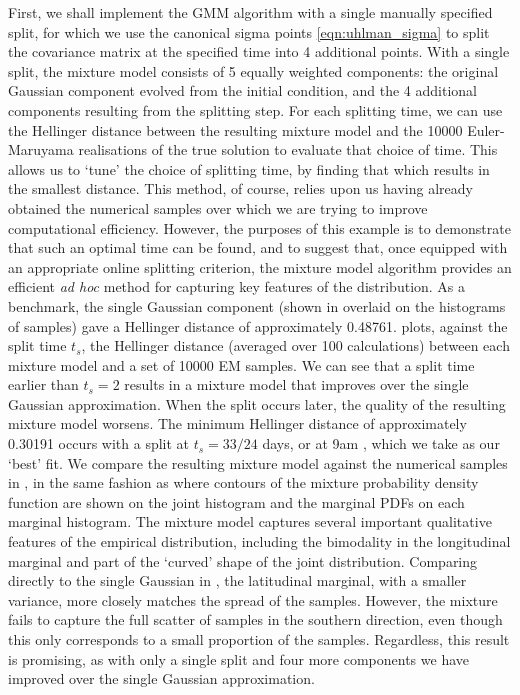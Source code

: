 First, we shall implement the GMM algorithm with a single manually specified split, for which we use the canonical sigma points \cref{eqn:uhlman_sigma} to split the covariance matrix at the specified time into 4 additional points.
With a single split, the mixture model consists of 5 equally weighted components: the original Gaussian component evolved from the initial condition, and the 4 additional components resulting from the splitting step.
For each splitting time, we can use the Hellinger distance between the resulting mixture model and the 10000 Euler-Maruyama realisations of the true solution to evaluate that choice of time.
This allows us to `tune' the choice of splitting time, by finding that which results in the smallest distance.
This method, of course, relies upon us having already obtained the numerical samples over which we are trying to improve computational efficiency.
However, the purposes of this example is to demonstrate that such an optimal time can be found, and to suggest that, once equipped with an appropriate online splitting criterion, the mixture model algorithm provides an efficient \emph{ad hoc} method for capturing key features of the distribution.
As a benchmark, the single Gaussian component (shown in  overlaid on the histograms of samples) gave a Hellinger distance of approximately 0.48761.
 plots, against the split time \(t_s\), the Hellinger distance (averaged over 100 calculations) between each mixture model and a set of 10000 EM samples.
We can see that a split time earlier than \(t_s = 2\) results in a mixture model that improves over the single Gaussian approximation.
When the split occurs later, the quality of the resulting mixture model worsens.
The minimum Hellinger distance of approximately 0.30191 occurs with a split at \(t_s = 33/24\) days, or at 9am , which we take as our `best' fit.
We compare the resulting mixture model against the numerical samples in , in the same fashion as  where contours of the mixture probability density function are shown on the joint histogram and the marginal PDFs on each marginal histogram.
The mixture model captures several important qualitative features of the empirical distribution, including the bimodality in the longitudinal marginal and part of the `curved' shape of the joint distribution.
Comparing directly to the single Gaussian in , the latitudinal marginal, with a smaller variance, more closely matches the spread of the samples.
However, the mixture fails to capture the full scatter of samples in the southern direction, even though this only corresponds to a small proportion of the samples.
Regardless, this result is promising, as with only a single split and four more components we have improved over the single Gaussian approximation.

